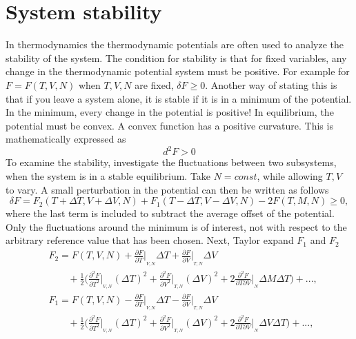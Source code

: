 \section{System stability}
In thermodynamics the thermodynamic potentials are often used to analyze the stability of the system. The condition for stability is that for fixed variables, any change in the thermodynamic potential system must be positive. For example for $F=F(T,V,N)$ when $T,V,N$ are fixed, $\delta F \geq0$. Another way of stating this is that if you leave a system alone, it is stable if it is in a minimum of the potential. In the minimum, every change in the potential is positive! In equilibrium, the potential must be convex. A convex function has a positive curvature. This is mathematically expressed as
\begin{equation}
	d^2F>0
\end{equation}   
To examine the stability, investigate the fluctuations between two subsystems, when the system is in a stable equilibrium. Take $N=const$, while allowing $T,V$ to vary. A small perturbation in the potential can then be written as follows
\begin{equation}
	\delta F=F_2(T+\Delta T, V+\Delta V, N)+F_1(T-\Delta T, V- \Delta V, N) - 2F(T,M,N)\geq 0,
	\label{variationF}
\end{equation} 
where the last term is included to subtract the average offset of the potential. Only the fluctuations around the minimum is of interest, not with respect to the arbitrary reference value that has been chosen. Next, Taylor expand $F_1 $ and $F_2$
\begin{equation}
	\begin{split}
		&F_2=F(T,V,N)+\frac{\partial F}{\partial T}\bigg|_{_{V,N}}\Delta T+\frac{\partial F}{\partial V}\bigg|_{_{T,N}}\Delta V\\
		&\qquad+\frac{1}{2}\bigg(\frac{\partial^2 F}{\partial T^2}\bigg|_{_{V,N}}(\Delta T)^2+\frac{\partial^2 F}{\partial V^2}\bigg|_{_{T,N}}(\Delta V)^2+2\frac{\partial^2 F}{\partial T \partial V}\bigg|_{_{N}}\Delta M \Delta T \bigg)+...,\\
		&F_1=F(T,V,N)-\frac{\partial F}{\partial T}\bigg|_{_{V,N}}\Delta T-\frac{\partial F}{\partial V}\bigg|_{_{T,N}}\Delta V\\
		&\qquad+\frac{1}{2}\bigg(\frac{\partial^2 F}{\partial T^2}\bigg|_{_{V,N}}(\Delta T)^2 +\frac{\partial^2 F}{\partial V^2}\bigg|_{_{T,N}}(\Delta V)^2+2\frac{\partial^2 F}{\partial T \partial V}\bigg|_{_{N}}\Delta V \Delta T \bigg)+...,
	\end{split}
	\label{taylor}
\end{equation}  
